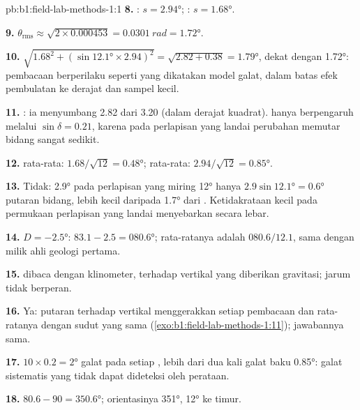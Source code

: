 \begin{solution}{pb:b1:field-lab-methods-1:1}
\textbf{8.} : $s = \ang{2.94}$; : $s = \ang{1.68}$.

\textbf{9.} $\theta_{\text{rms}} \approx \sqrt{2\times0.000453} =
\qty{0.0301}{rad} = \ang{1.72}$.

\textbf{10.} $\sqrt{1.68^2 + (\sin\ang{12.1}\times2.94)^2} = \sqrt{2.82 +
0.38} = \ang{1.79}$, dekat dengan \ang{1.72}: pembacaan berperilaku seperti yang dikatakan model galat, dalam batas efek pembulatan ke derajat dan sampel kecil.

\textbf{11.} : ia menyumbang 2.82 dari 3.20 (dalam derajat kuadrat).  hanya berpengaruh melalui $\sin\delta = 0.21$, karena pada perlapisan yang landai perubahan  memutar bidang sangat sedikit.

\textbf{12.}  rata-rata: $1.68/\sqrt{12} = \ang{0.48}$;  rata-rata:
$2.94/\sqrt{12} = \ang{0.85}$.

\textbf{13.} Tidak: \ang{2.9}  pada perlapisan yang miring \ang{12} hanya
$2.9\sin\ang{12.1} = \ang{0.6}$ putaran bidang, lebih kecil daripada \ang{1.7} dari . Ketidakrataan kecil pada permukaan perlapisan yang landai menyebarkan  secara lebar.

\textbf{14.} $D = \ang{-2.5}$: $83.1 - 2.5 = \ang{080.6}$; rata-ratanya adalah
$080.6/12.1$, sama dengan milik ahli geologi pertama.

\textbf{15.}  dibaca dengan klinometer, terhadap vertikal yang diberikan gravitasi; jarum tidak berperan.

\textbf{16.} Ya: putaran terhadap vertikal menggerakkan setiap pembacaan dan rata-ratanya dengan sudut yang sama (\cref{exo:b1:field-lab-methods-1:11}); jawabannya sama.

\textbf{17.} $10\times0.2 = \ang{2}$ galat pada setiap , lebih dari dua kali galat baku \ang{0.85}: galat sistematis yang tidak dapat dideteksi oleh perataan.

\textbf{18.} $80.6 - 90 = \ang{350.6}$; orientasinya  \ang{351},  \ang{12} ke timur.


\end{solution}
